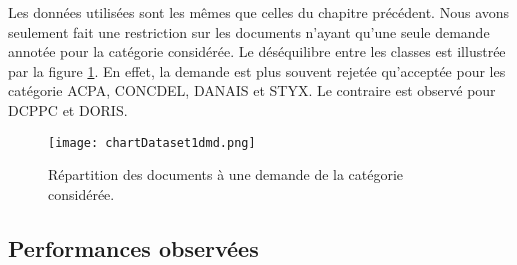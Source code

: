 Les données utilisées sont les mêmes que celles du chapitre précédent. Nous avons seulement fait une restriction sur les documents n'ayant qu'une seule demande annotée pour la catégorie considérée. Le déséquilibre entre les classes est illustrée par la figure \ref{fig:sensresultat:stat-1dmd}. En effet, la demande est plus souvent rejetée qu'acceptée pour les catégorie ACPA, CONCDEL, DANAIS et STYX. Le contraire est observé pour DCPPC et DORIS.
\begin{figure}[htb]
\texttt{[image: chartDataset1dmd.png]}
\caption{Répartition des documents à une demande de la catégorie considérée.}\label{fig:sensresultat:stat-1dmd}
\end{figure}

\subsection{Performances observées}

